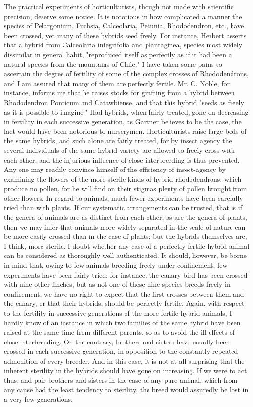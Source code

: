 The practical experiments of horticulturists, though not made with scientific precision, deserve some notice. It is notorious in how complicated a manner the species of Pelargonium, Fuchsia, Calceolaria, Petunia, Rhododendron, etc., have been crossed, yet many of these hybrids seed freely. For instance, Herbert asserts that a hybrid from Calceolaria integrifolia and plantaginea, species most widely dissimilar in general habit, "reproduced itself as perfectly as if it had been a natural species from the mountains of Chile." I have taken some pains to ascertain the degree of fertility of some of the complex crosses of Rhododendrons, and I am assured that many of them are perfectly fertile. Mr. C. Noble, for instance, informs me that he raises stocks for grafting from a hybrid between Rhododendron Ponticum and Catawbiense, and that this hybrid "seeds as freely as it is possible to imagine." Had hybrids, when fairly treated, gone on decreasing in fertility in each successive generation, as Gartner believes to be the case, the fact would have been notorious to nurserymen. Horticulturists raise large beds of the same hybrids, and such alone are fairly treated, for by insect agency the several individuals of the same hybrid variety are allowed to freely cross with each other, and the injurious influence of close interbreeding is thus prevented. Any one may readily convince himself of the efficiency of insect-agency by examining the flowers of the more sterile kinds of hybrid rhododendrons, which produce no pollen, for he will find on their stigmas plenty of pollen brought from other flowers.
In regard to animals, much fewer experiments have been carefully tried than with plants. If our systematic arrangements can be trusted, that is if the genera of animals are as distinct from each other, as are the genera of plants, then we may infer that animals more widely separated in the scale of nature can be more easily crossed than in the case of plants; but the hybrids themselves are, I think, more sterile. I doubt whether any case of a perfectly fertile hybrid animal can be considered as thoroughly well authenticated. It should, however, be borne in mind that, owing to few animals breeding freely under confinement, few experiments have been fairly tried: for instance, the canary-bird has been crossed with nine other finches, but as not one of these nine species breeds freely in confinement, we have no right to expect that the first crosses between them and the canary, or that their hybrids, should be perfectly fertile. Again, with respect to the fertility in successive generations of the more fertile hybrid animals, I hardly know of an instance in which two families of the same hybrid have been raised at the same time from different parents, so as to avoid the ill effects of close interbreeding. On the contrary, brothers and sisters have usually been crossed in each successive generation, in opposition to the constantly repeated admonition of every breeder. And in this case, it is not at all surprising that the inherent sterility in the hybrids should have gone on increasing. If we were to act thus, and pair brothers and sisters in the case of any pure animal, which from any cause had the least tendency to sterility, the breed would assuredly be lost in a very few generations.
